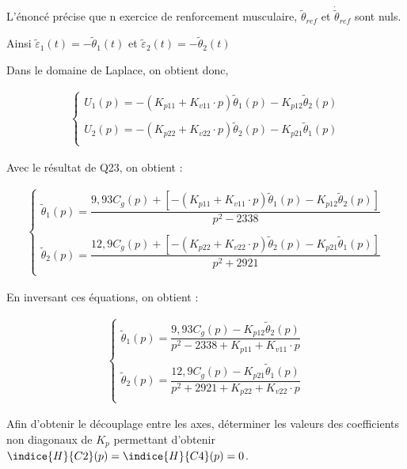 \documentclass[11pt]{article}
\begin{document}
\begin{UPSTIcorrige}
L'énoncé précise que n exercice de renforcement musculaire, $\tilde{\theta}_{ref}$ et $\dot{\tilde{\theta}}_{ref}$ sont nuls.

Ainsi $\tilde{\varepsilon}_1(t)=-\tilde{\theta}_1(t)$ et $\tilde{\varepsilon}_2(t)=-\tilde{\theta}_2(t)$

Dans le domaine de Laplace, on obtient donc,

\begin{align*}
\left\{
\begin{array}{l}
U_1(p)=-\left(K_{p11}+K_{v11}\cdot p\right)\tilde{\theta}_1(p)-K_{p12}\tilde{\theta}_2(p)\\
\\
U_2(p)=-\left(K_{p22}+K_{v22}\cdot p\right)\tilde{\theta}_2(p)-K_{p21}\tilde{\theta}_1(p)\\
\end{array}
\right.
\end{align*}

Avec le résultat de Q23, on obtient : 


\begin{align*}
\left\{
\begin{array}{l}
\tilde{\theta}_1(p)=\dfrac{9,93C_g(p)+\left[-\left(K_{p11}+K_{v11}\cdot p\right)\tilde{\theta}_1(p)-K_{p12}\tilde{\theta}_2(p)\right]}{p^2-2338}\\
\\
\tilde{\theta}_2(p)=\dfrac{12,9C_g(p)+\left[-\left(K_{p22}+K_{v22}\cdot p\right)\tilde{\theta}_2(p)-K_{p21}\tilde{\theta}_1(p)\right]}{p^2+2921}\\
\end{array}
\right.
\end{align*}

En inversant ces équations, on obtient : 

\begin{align*}
\left\{
\begin{array}{l}
\tilde{\theta}_1(p)=\dfrac{9,93C_g(p)-K_{p12}\tilde{\theta}_2(p)}{p^2-2338+K_{p11}+K_{v11}\cdot p}\\
\\
\tilde{\theta}_2(p)=\dfrac{12,9C_g(p)-K_{p21}\tilde{\theta}_1(p)}{p^2+2921+K_{p22}+K_{v22}\cdot p}\\
\end{array}
\right.
\end{align*}

\end{UPSTIcorrige}


\UPSTIquestion Afin d’obtenir le découplage entre les axes, déterminer les valeurs des coefficients non diagonaux de
$K_p$ permettant d’obtenir $\indice{H}{C2}(p)=\indice{H}{C4}(p)=0$.
\end{document}
